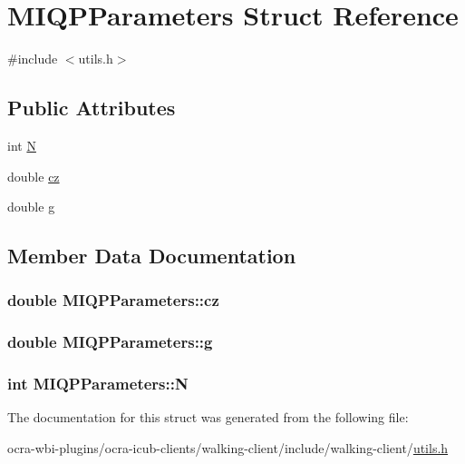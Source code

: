 \hypertarget{structMIQPParameters}{\section{\-M\-I\-Q\-P\-Parameters \-Struct \-Reference}
\label{structMIQPParameters}
}


{\ttfamily \#include $<$utils.\-h$>$}

\subsection*{\-Public \-Attributes}
\begin{DoxyCompactItemize}
\item 
int \hyperlink{structMIQPParameters_ae421b7ca77da7e1e50239ab58b8771c5}{\-N}
\item 
double \hyperlink{structMIQPParameters_ab8158e2bf119d70c9856b6a277e3c42a}{cz}
\item 
double \hyperlink{structMIQPParameters_a31eca71d200b5b1468bd60b3266d0688}{g}
\end{DoxyCompactItemize}


\subsection{\-Member \-Data \-Documentation}
\hypertarget{structMIQPParameters_ab8158e2bf119d70c9856b6a277e3c42a}{
\subsubsection[{cz}]{\setlength{\rightskip}{0pt plus 5cm}double {\bf \-M\-I\-Q\-P\-Parameters\-::cz}}}\label{structMIQPParameters_ab8158e2bf119d70c9856b6a277e3c42a}
\hypertarget{structMIQPParameters_a31eca71d200b5b1468bd60b3266d0688}{
\subsubsection[{g}]{\setlength{\rightskip}{0pt plus 5cm}double {\bf \-M\-I\-Q\-P\-Parameters\-::g}}}\label{structMIQPParameters_a31eca71d200b5b1468bd60b3266d0688}
\hypertarget{structMIQPParameters_ae421b7ca77da7e1e50239ab58b8771c5}{
\subsubsection[{\-N}]{\setlength{\rightskip}{0pt plus 5cm}int {\bf \-M\-I\-Q\-P\-Parameters\-::\-N}}}\label{structMIQPParameters_ae421b7ca77da7e1e50239ab58b8771c5}


\-The documentation for this struct was generated from the following file\-:\begin{DoxyCompactItemize}
\item 
ocra-\/wbi-\/plugins/ocra-\/icub-\/clients/walking-\/client/include/walking-\/client/\hyperlink{utils_8h}{utils.\-h}\end{DoxyCompactItemize}
